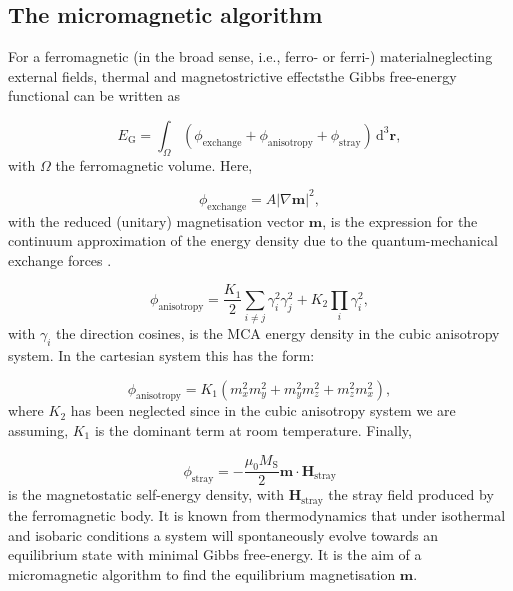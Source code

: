 \documentclass[review,authoryear]{elsarticle}
\begin{document}
\subsection{The micromagnetic algorithm}
For a ferromagnetic (in the broad sense, i.e., ferro- or ferri-) material{\textemdash}neglecting external fields, thermal and magnetostrictive effects{\textemdash}the Gibbs free-energy functional can be written as \citep{Brown}
{\par\nobreak\noindent}
\begin{equation}
E_\text{G} = \int_{\Omega} (\phi_{\text{exchange}} + \phi_{\text{anisotropy}} + \phi_{\text{stray}})\,\text{d}^3 \boldsymbol{r},
\end{equation}
with $\Omega$ the ferromagnetic volume. Here,
{\par\nobreak\noindent}
\begin{equation}
\phi_{\text{exchange}}=A|\nabla\boldsymbol{m}|^2,
\end{equation}
 with the reduced (unitary) magnetisation vector $\boldsymbol{m}$, is the expression for the continuum approximation of the energy density due to the quantum-mechanical exchange forces \citep{Landau1935}.\par
 
{\par\nobreak\noindent}
\begin{equation}
\phi_{\text{anisotropy}}=\frac{K_1}{2}\sum_{i\neq j}\gamma_i^2\gamma_j^2 + K_2\prod_i\gamma_i^2,
\end{equation}
with $\gamma_i$ the direction cosines, is the MCA energy density in the cubic anisotropy system. In the cartesian system this has the form:
{\par\nobreak\noindent}
\begin{equation}
\phi_{\text{anisotropy}}=K_1(m_x^2m_y^2+m_y^2m_z^2+m_z^2m_x^2),
\end{equation}
where $K_2$ has been neglected since in the cubic anisotropy system we are assuming, $K_1$ is the dominant term at room temperature. Finally,
{\par\nobreak\noindent}
\begin{equation}
\phi_{\text{stray}}=-\frac{\mu_0M_\text{S}}{2}\boldsymbol{m}\cdot\boldsymbol{H}_{\text{stray}}
\end{equation}
is the magnetostatic self-energy density, with $\boldsymbol{H}_{\text{stray}}$ the stray field produced by the ferromagnetic body. It is known from thermodynamics that under isothermal and isobaric conditions a system will spontaneously evolve towards an equilibrium state with minimal Gibbs free-energy. It is the aim of a micromagnetic algorithm to find the equilibrium magnetisation $\boldsymbol{m}$.\par
\end{document}
